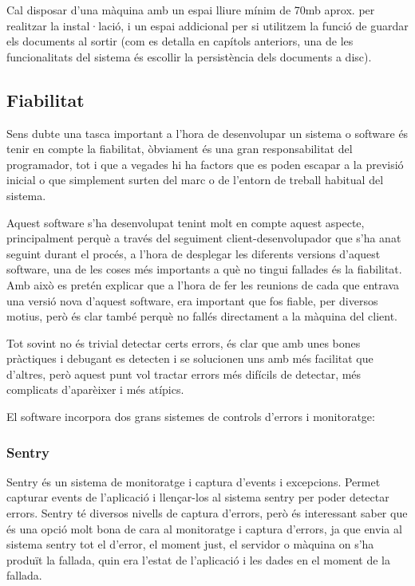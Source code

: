 \documentclass[letterpaper,11pt,catalan]{sphinxmanual}
\begin{document}
Cal disposar d'una màquina amb un espai lliure mínim de 70mb aprox. per realitzar la instal·lació,
i un espai addicional per si utilitzem la funció de guardar els documents al sortir (com es detalla
en capítols anteriors, una de les funcionalitats del sistema és escollir la persistència dels documents
a disc).


\subsection{Fiabilitat}
\label{\detokenize{index:fiabilitat}}
Sens dubte una tasca important a l'hora de desenvolupar un sistema o software és tenir en compte la fiabilitat,
òbviament és una gran responsabilitat del programador, tot i que a vegades hi ha factors
que es poden escapar a la previsió inicial o que simplement surten del marc o de l'entorn
de treball habitual del sistema.

Aquest software s'ha desenvolupat tenint molt en compte aquest aspecte, principalment
perquè a través del seguiment client-desenvolupador que s'ha anat seguint durant el procés,
a l'hora de desplegar les diferents versions d'aquest software, una de les coses més importants
a què no tingui fallades és la fiabilitat. Amb això es pretén explicar que a l'hora de fer
les reunions de cada  que entrava una versió nova d'aquest software, era important
que fos fiable, per diversos motius, però és clar també perquè no fallés directament a
la màquina del client.

Tot sovint no és trivial detectar certs errors, és clar que amb unes bones pràctiques i debugant
es detecten i se solucionen uns amb més facilitat que d'altres, però aquest punt vol tractar
errors més difícils de detectar, més complicats d'aparèixer i més atípics.

El software incorpora dos grans sistemes de controls d'errors i monitoratge:


\subsubsection{Sentry}
\label{\detokenize{index:sentry}}
Sentry és un sistema de monitoratge i captura d'events i excepcions. Permet capturar
events de l'aplicació i llençar-los al sistema sentry per poder detectar errors. Sentry
té diversos nivells de captura d'errors, però és interessant saber que és una opció molt
bona de cara al monitoratge i captura d'errors, ja que envia al sistema sentry
tot el  d'error, el moment just, el servidor o màquina on s'ha produït la fallada,
quin era l'estat de l'aplicació i les dades en el moment de la fallada.
\end{document}
